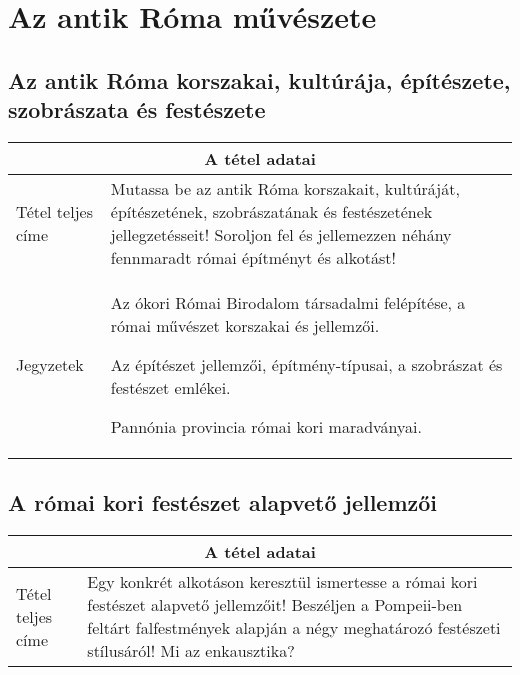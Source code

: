 \chapter{Az antik Róma művészete} %
\label{ch:3_antik_roma}

\section{Az antik Róma korszakai, kultúrája, építészete, szobrászata és festészete}

\begin{center}
	\begin{longtable}{ | p{} | p{} | }
		
		\hline
		\multicolumn{2}{|c|}{\textbf{A tétel adatai}}
		\\ \hline
		
		\hline
		Tétel teljes címe
		& 
		Mutassa be az antik Róma korszakait, kultúráját, építészetének, szobrászatának és festészetének jellegzetésseit! Soroljon fel és jellemezzen néhány fennmaradt római építményt és alkotást!
		\\ \hline
		
		Jegyzetek &
		\begin{compactitem}
			\item Az ókori Római Birodalom társadalmi felépítése, a római művészet korszakai és jellemzői.
			\item Az építészet jellemzői, építmény-típusai, a szobrászat és festészet emlékei.
			\item Pannónia provincia római kori maradványai.
		\end{compactitem}
		\\\hline
		
	\end{longtable}
\end{center}

\cleardoublepage


\section{A római kori festészet alapvető jellemzői}

\begin{center}
	\begin{longtable}{ | p{} | p{} | }
		
		\hline
		\multicolumn{2}{|c|}{\textbf{A tétel adatai}}
		\\ \hline
		
		\hline
		Tétel teljes címe 
		&
		Egy konkrét alkotáson keresztül ismertesse a római kori festészet alapvető jellemzőit! Beszéljen a Pompeii-ben feltárt falfestmények alapján a négy meghatározó festészeti stílusáról! Mi az enkausztika?
		\\ \hline
		
	\end{longtable}
\end{center}